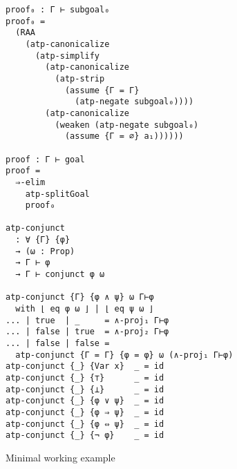 \documentclass{article}
\begin{document}
\begin{listing}[ht]
\begin{verbatim}
proof₀ : Γ ⊢ subgoal₀
proof₀ =
  (RAA
    (atp-canonicalize
      (atp-simplify
        (atp-canonicalize
          (atp-strip
            (assume {Γ = Γ}
              (atp-negate subgoal₀))))
        (atp-canonicalize
          (weaken (atp-negate subgoal₀)
            (assume {Γ = ∅} a₁))))))

proof : Γ ⊢ goal
proof =
  ⇒-elim
    atp-splitGoal
    proof₀

atp-conjunct
  : ∀ {Γ} {φ}
  → (ω : Prop)
  → Γ ⊢ φ
  → Γ ⊢ conjunct φ ω

atp-conjunct {Γ} {φ ∧ ψ} ω Γ⊢φ
  with ⌊ eq φ ω ⌋ | ⌊ eq ψ ω ⌋
... | true  | _     = ∧-proj₁ Γ⊢φ
... | false | true  = ∧-proj₂ Γ⊢φ
... | false | false =
  atp-conjunct {Γ = Γ} {φ = φ} ω (∧-proj₁ Γ⊢φ)
atp-conjunct {_} {Var x}  _ = id
atp-conjunct {_} {⊤}      _ = id
atp-conjunct {_} {⊥}      _ = id
atp-conjunct {_} {φ ∨ ψ}  _ = id
atp-conjunct {_} {φ ⇒ ψ}  _ = id
atp-conjunct {_} {φ ⇔ ψ}  _ = id
atp-conjunct {_} {¬ φ}    _ = id
\end{verbatim}
\caption{Minimal working example}
\label{listing:1}
\end{listing}
\end{document}
